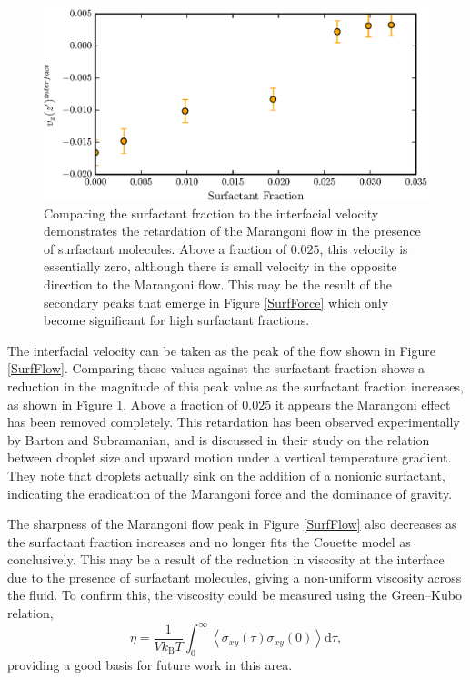 \FloatBarrier
\begin{figure}[h!]
\centering
\includegraphics[scale=1.0]{InterVel}
\caption{Comparing the surfactant fraction to the interfacial velocity demonstrates the retardation of the Marangoni flow in the presence of surfactant molecules.
Above a fraction of $0.025$, this velocity is essentially zero, although there is small velocity in the opposite direction to the Marangoni flow.
This may be the result of the secondary peaks that emerge in Figure \ref{SurfForce} which only become significant for high surfactant fractions.
}
\label{InterVel}
\end{figure}
The interfacial velocity can be taken as the peak of the flow shown in Figure \ref{SurfFlow}.
Comparing these values against the surfactant fraction shows a reduction in the magnitude of this peak value as the surfactant fraction increases, as shown in Figure \ref{InterVel}.
Above a fraction of $0.025$ it appears the Marangoni effect has been removed completely.
This retardation has been observed experimentally by Barton and Subramanian, and is discussed in their study on the relation between droplet size and upward motion under a vertical temperature gradient.\cite{BartonSubramanian} 
They note that droplets actually sink on the addition of a nonionic surfactant, indicating the eradication of the Marangoni force and the dominance of gravity.

\FloatBarrier
The sharpness of the Marangoni flow peak in Figure \ref{SurfFlow} also decreases as the surfactant fraction increases and no longer fits the Couette model as conclusively.
This may be a result of the reduction in viscosity at the interface due to the presence of surfactant molecules, giving a non-uniform viscosity across the fluid. 
To confirm this, the viscosity could be measured using the Green--Kubo relation,
\begin{equation}
\eta = \frac{1}{V k_{\mathrm{B}} T} \int_{0}^{\infty} \left< \sigma_{xy} \left( \tau \right) \sigma_{xy}(0) \right> \mathrm{d} \tau,
\end{equation}
providing a good basis for future work in this area.
